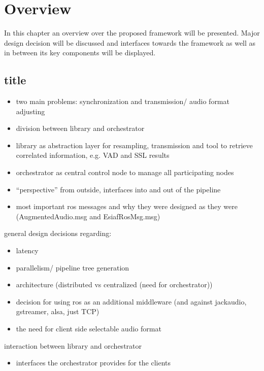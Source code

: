 

\chapter{Overview}

In this chapter an overview over the proposed framework will be presented. 
Major design decision will be discussed and interfaces towards the framework as well as in between its key components will be displayed.

\section{title}

\begin{itemize}
	\item two main problems: synchronization and transmission/ audio format adjusting
	\item division between library and orchestrator
	\item library as abstraction layer for resampling, transmission and tool to retrieve correlated information, e.g. VAD and SSL results
	\item orchestrator as central control node to manage all participating nodes
	\item ``perspective'' from outside, interfaces into and out of the pipeline
	\item most important ros messages and why they were designed as they were (AugmentedAudio.msg and EsiafRosMsg.msg)
\end{itemize}

general design decisions regarding:

\begin{itemize}
	\item latency
	\item parallelism/ pipeline tree generation
	\item architecture (distributed vs centralized (need for orchestrator))
	\item decision for using ros as an additional middleware (and against jackaudio, gstreamer, alsa, just TCP)
	\item the need for client side selectable audio format 
\end{itemize}

interaction between library and orchestrator

\begin{itemize}
	\item interfaces the orchestrator provides for the clients
\end{itemize}